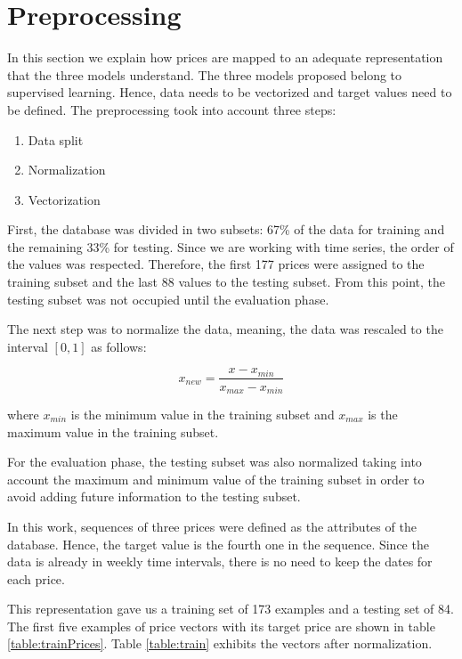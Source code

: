 \section{Preprocessing}
In this section we explain how prices are mapped to an adequate representation that the three models understand. The three models proposed belong to supervised learning. Hence, data needs to be vectorized and target values need to be defined. The preprocessing took into account three steps:

\begin{enumerate}
\item Data split
\item Normalization
\item Vectorization
\end{enumerate}

First, the database was divided in two subsets: 67\% of the data for training and the remaining 33\% for testing. Since we are working with time series, the order of the values was respected. Therefore, the first 177 prices were assigned to the training subset and the last 88 values to the testing subset. From this point, the testing subset was not occupied until the evaluation phase.

The next step was to normalize the data, meaning, the data was rescaled to the interval $[0,1]$ as follows:

\begin{equation}
\label{eq:normalize}
x_{new}=\frac{x-x_{min}}{x_{max}-x_{min}}
\end{equation}

where $x_{min}$ is the minimum value in the training subset and $x_{max}$ is the maximum value in the training subset. 

For the evaluation phase, the testing subset was also normalized taking into account the maximum and minimum value of the training subset in order to avoid adding future information to the testing subset.

In this work, sequences of three prices were defined as the attributes of the database. Hence, the target value is the fourth one in the sequence. Since the data is already in weekly time intervals, there is no need to keep the dates for each price.

This representation gave us a training set of 173 examples and a testing set of 84. The first five examples of price vectors with its target price are shown in table \ref{table:trainPrices}. Table \ref{table:train} exhibits the vectors after normalization.


